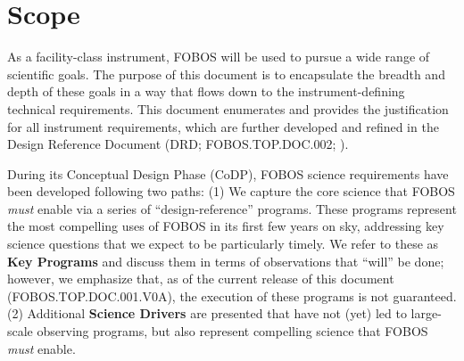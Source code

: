 \documentclass[11pt,a4paper,twoside,onecolumn,openany,final,oldfontcommands]{memoir}
\newcommand{\project}{FOBOS}
\newcommand{\wbs}{TOP}
\newcommand{\doctype}{DOC}
\newcommand{\docnumber}{001}
\newcommand{\docversion}{0A}
\newcommand{\docsysnum}{{\project}.{\wbs}.{\doctype}.{\docnumber}.V{\docversion}}
\begin{document}



\section{Scope}

As a facility-class instrument, FOBOS will be used to pursue a wide range of scientific goals.  The purpose of this document is to encapsulate the breadth and depth of these goals in a way that flows down to the instrument-defining technical requirements.  This document enumerates and provides the justification for all instrument requirements, which are further developed and refined in the Design Reference Document (DRD; FOBOS.TOP.DOC.002; ).

During its Conceptual Design Phase (CoDP), FOBOS science requirements have been developed following two paths: (1) We capture the core science that FOBOS {\it must} enable via a series of  ``design-reference'' programs.  These programs represent the most compelling uses of FOBOS in its first few years on sky, addressing key science questions that we expect to be particularly timely.  We refer to these as {\bf Key Programs} and discuss them in terms of observations that ``will'' be done; however, we emphasize that, as of the current release of this document (\docsysnum), the execution of these programs is not guaranteed.  (2) Additional {\bf Science Drivers} are presented that have not (yet) led to large-scale observing programs, but also represent compelling science that FOBOS {\it must} enable.
\end{document}
